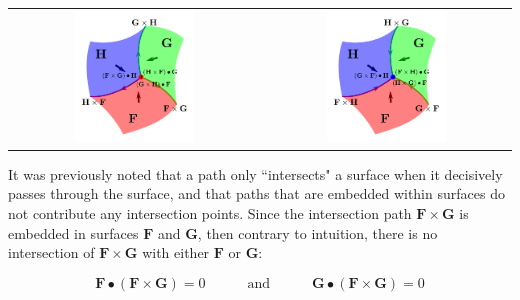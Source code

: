 \begin{tabular}{cc}
\parbox{0.5\textwidth}{
\includegraphics[width = 0.5\textwidth]{Intersections/Surface-surface_intersections/surface_surface_surface_intersections}
} & \parbox{0.5\textwidth}{
\includegraphics[width = 0.5\textwidth]{Intersections/Surface-surface_intersections/surface_surface_surface_intersections_reversed}
}
\end{tabular}

It was previously noted that a path only ``intersects" a surface when it decisively passes through the surface, and that paths that are embedded within surfaces do not contribute any intersection points. Since the intersection path \(\mathbf{F} \times \mathbf{G}\) is embedded in surfaces \(\mathbf{F}\) and \(\mathbf{G}\), then contrary to intuition, there is no intersection of \(\mathbf{F} \times \mathbf{G}\) with either \(\mathbf{F}\) or \(\mathbf{G}\):
\begin{thm}
\[\mathbf{F} \bullet (\mathbf{F} \times \mathbf{G}) = 0 \quad\quad\quad\text{and}\quad\quad\quad \mathbf{G} \bullet (\mathbf{F} \times \mathbf{G}) = 0\]  
\end{thm}





